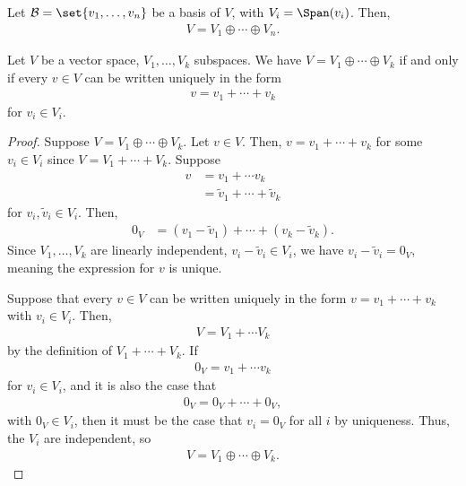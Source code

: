 \documentclass[10pt]{mypackage}
\begin{document}
\begin{example}
  Let $\mathcal{B} = \set{v_1,\dots,v_n}$ be a basis of $V$, with $V_i = \Span(v_i)$. Then,
  \begin{align*}
    V = V_1\oplus \cdots \oplus V_n.
  \end{align*}
\end{example}
\begin{lemma}
  Let $V$ be a vector space, $V_1,\dots,V_k$ subspaces. We have $V = V_1\oplus \cdots \oplus V_k$ if and only if every $v\in V$ can be written uniquely in the form
  \begin{align*}
    v = v_1 +\cdots + v_k
  \end{align*}
  for $v_i\in V_i$.
\end{lemma}
\begin{proof}
  Suppose $V = V_1\oplus\cdots\oplus V_k$. Let $v\in V$. Then, $v = v_1 + \cdots + v_k$ for some $v_i\in V_i$ since $V = V_1+\cdots+V_k$. Suppose
  \begin{align*}
    v &= v_1 + \cdots v_k\\
      &= \tilde{v}_1 + \cdots + \tilde{v}_k
  \end{align*}
  for $v_i,\tilde{v}_i\in V_i$. Then,
  \begin{align*}
    0_V &= \left(v_1 - \tilde{v}_1\right) + \cdots + \left(v_k - \tilde{v}_k\right).
  \end{align*}
  Since $V_1,\dots,V_k$ are linearly independent, $v_i - \tilde{v}_i\in V_i$, we have $v_i - \tilde{v}_i = 0_V$, meaning the expression for $v$ is unique.\newline

  Suppose that every $v\in V$ can be written uniquely in the form $v = v_1 + \cdots + v_k$ with $v_i\in V_i$. Then,
  \begin{align*}
    V = V_1 + \cdots V_k
  \end{align*}
  by the definition of $V_1 + \cdots + V_k$. If
  \begin{align*}
    0_V = v_1 + \cdots v_k
  \end{align*}
  for $v_i\in V_i$, and it is also the case that
  \begin{align*}
    0_V = 0_V + \cdots + 0_V,
  \end{align*}
  with $0_V \in V_i$, then it must be the case that $v_i = 0_V$ for all $i$ by uniqueness. Thus, the $V_i$ are independent, so
  \begin{align*}
    V = V_1\oplus\cdots\oplus V_k.
  \end{align*}
\end{proof}
\end{document}
